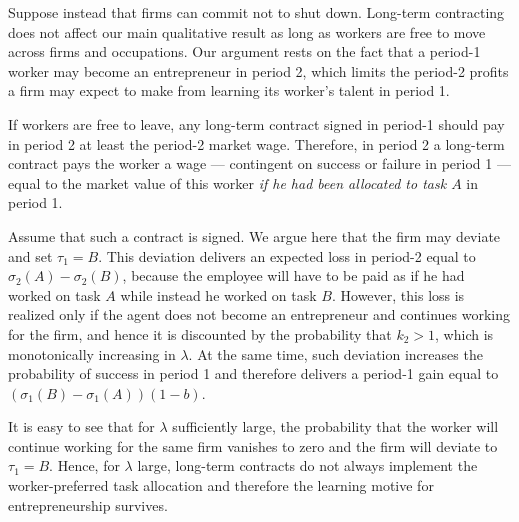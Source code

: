 \documentclass[12pt,american]{paper}
\theoremstyle{remark}
\begin{document}
Suppose instead that firms can commit not to shut down. Long-term contracting does not affect our main qualitative result  as long as workers are free to move across firms and occupations.  Our argument rests on the fact that a period-1 worker may become an entrepreneur in period 2, which limits the period-2 profits a firm may expect to make from learning its worker's talent in period 1. 

If workers are free to leave, any long-term contract signed in period-1 should pay in period 2 at least the period-2 market wage. Therefore, in period 2 a long-term contract pays the worker  a wage --- contingent on success or failure in period 1 --- equal to the market value of this worker \emph{if he had been allocated to task $A$} in period 1. 


Assume that such a contract is signed. We argue here that the firm may deviate and set $\tau_1=B$. This deviation delivers an expected loss in period-2 equal to $\sigma_2(A)-\sigma_2(B)$, because the employee will have to be paid as if he had worked on task $A$ while instead he worked on task $B$. However, this loss is realized only if the agent does not become an entrepreneur and continues working for the firm, and hence it is discounted by the probability that $k_2>1$, which is monotonically increasing in $\lambda$. At the same time, such deviation increases the probability of success in period 1 and therefore delivers a period-1 gain equal to $(\sigma_1(B)-\sigma_1(A))(1-b)$. 

It is easy to see that for $\lambda$ sufficiently large, the probability that the worker will continue working for the same firm vanishes to zero and the firm will deviate to  $\tau_1=B$. Hence, for $\lambda$ large, long-term contracts do not always implement the worker-preferred task allocation and therefore the learning motive for entrepreneurship survives.

{}

\end{document}
